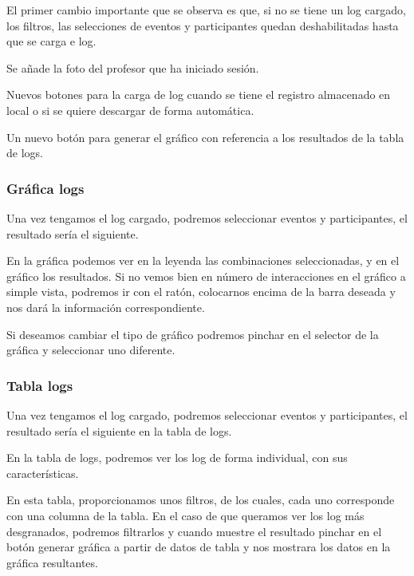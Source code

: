 El primer cambio importante que se observa es que, si no se tiene un log cargado, los filtros, las selecciones de eventos y participantes quedan deshabilitadas hasta que se carga e log.

Se añade la foto del profesor que ha iniciado sesión.

Nuevos botones para la carga de log cuando se tiene el registro almacenado en local o si se quiere descargar de forma automática.

Un nuevo botón para generar el gráfico con referencia a los resultados de la tabla de logs.

\subsubsection{Gráfica logs}\label{grafica-logs}

Una vez tengamos el log cargado, podremos seleccionar eventos y participantes, el resultado sería el siguiente.


En la gráfica podemos ver en la leyenda las combinaciones seleccionadas, y en el gráfico los resultados. Si no vemos bien en número de interacciones en el gráfico a simple vista, podremos ir con el ratón, colocarnos encima de la barra deseada y nos dará la información correspondiente.

Si deseamos cambiar el tipo de gráfico podremos pinchar en el selector de la gráfica y seleccionar uno diferente.

\subsubsection{Tabla logs}\label{tabla-logs}

Una vez tengamos el log cargado, podremos seleccionar eventos y participantes, el resultado sería el siguiente en la tabla de logs.


En la tabla de logs, podremos ver los log de forma individual, con sus características.

En esta tabla, proporcionamos unos filtros, de los cuales, cada uno corresponde con una columna de la tabla. En el caso de que queramos ver los log más desgranados, podremos filtrarlos y cuando muestre el resultado pinchar en el botón generar gráfica a partir de datos de tabla y nos mostrara los datos en la gráfica resultantes.



















